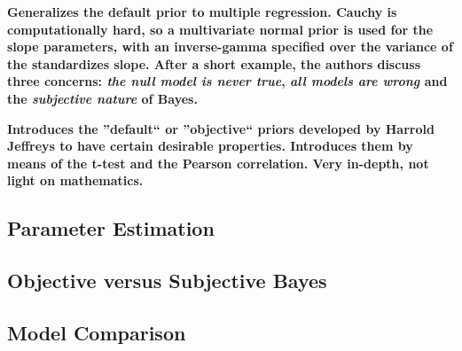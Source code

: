 \documentclass[12pt]{scrartcl}
\begin{document}
\begin{description}
  \textbf{Generalizes the default prior to multiple regression. Cauchy is computationally hard, so a multivariate normal prior is used for the slope parameters, with an inverse-gamma specified over the variance of the standardizes slope. After a short example, the authors discuss three concerns: \emph{the null model is never true}, \emph{all models are wrong} and the \emph{subjective nature} of Bayes.}
  
  \item {}
  
  \item {}
  
  \item {}
  
  \textbf{Introduces the ''default`` or ''objective`` priors developed by Harrold Jeffreys to have certain desirable properties. Introduces them by means of the t-test and the Pearson correlation. Very in-depth, not light on mathematics.}
\end{description}


\subsection{Parameter Estimation}
\begin{description}
  \item {}
  
  \item {}
\end{description}


\subsection{Objective versus Subjective Bayes}
\begin{description}
  \item {}
\end{description}

\subsection{Model Comparison}
\begin{description}
  \item {}
\end{description}
\end{document}
